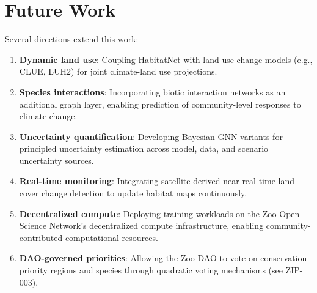 \section{Future Work}

\label{sec:future}

Several directions extend this work:

\begin{enumerate}
  \item \textbf{Dynamic land use}: Coupling HabitatNet with land-use
    change models (e.g., CLUE, LUH2) for joint climate-land use
    projections.
  \item \textbf{Species interactions}: Incorporating biotic interaction
    networks as an additional graph layer, enabling prediction of
    community-level responses to climate change.
  \item \textbf{Uncertainty quantification}: Developing Bayesian GNN
    variants for principled uncertainty estimation across model,
    data, and scenario uncertainty sources.
  \item \textbf{Real-time monitoring}: Integrating satellite-derived
    near-real-time land cover change detection to update habitat maps
    continuously.
  \item \textbf{Decentralized compute}: Deploying training workloads on
    the Zoo Open Science Network's decentralized compute infrastructure,
    enabling community-contributed computational resources.
  \item \textbf{DAO-governed priorities}: Allowing the Zoo DAO to vote
    on conservation priority regions and species through quadratic
    voting mechanisms (see ZIP-003).
\end{enumerate}


